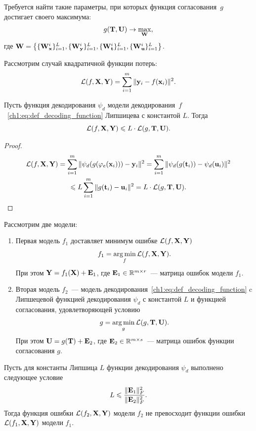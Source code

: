 Требуется найти такие параметры, при которых функция согласования~$g$ достигает своего максимума:
\begin{equation}
	g(\mathbf{T}, \mathbf{U}) \rightarrow \max_{\mathbf{W}},
	\label{concordance}
\end{equation}
где $\mathbf{W} = \bigl\{\{\mathbf{W}_{\mathbf{x}}^i\}_{i=1}^L, \{\mathbf{W}_{\mathbf{y}}^i\}_{i=1}^L, \{\mathbf{W}_{\mathbf{t}}^i\}_{i=1}^L, \{\mathbf{W}_{\mathbf{u}}^i\}_{i=1}^L\bigr\}$.

\hrulefill


Рассмотрим случай квадратичной функции потерь:
\[
\mathcal{L}(f, \mathbf{X}, \mathbf{Y}) = \sum_{i=1}^m \| \mathbf{y}_i - f(\mathbf{x}_i) \|^2.
\]

\begin{statement}
	\label{ch1:st:decod_lip}
	Пусть функция декодирования $\psi_d$ модели декодирования~$f$~\eqref{ch1:eq:def_decoding_function} Липшицева с константой $L$. Тогда 
	\[
		\mathcal{L}(f, \mathbf{X}, \mathbf{Y}) \leqslant L \cdot \mathcal{L}(g, \mathbf{T}, \mathbf{U}).
	\]
\end{statement}

\begin{proof}
	\begin{multline*}
		\mathcal{L}(f, \mathbf{X}, \mathbf{Y}) = \sum_{i=1}^m \| \psi_d (g (\varphi_e(\mathbf{x}_i))) - \mathbf{y}_i \|^2  = \sum_{i=1}^m \| \psi_d (g (\mathbf{t}_i)) - \psi_d (\mathbf{u}_i) \|^2 \\\leqslant L \sum_{i=1}^m \| g (\mathbf{t}_i) - \mathbf{u}_i \|^2 = L \cdot \mathcal{L}(g, \mathbf{T}, \mathbf{U}).
	\end{multline*}
\end{proof}
\begin{theorem}
	Рассмотрим две модели:
	\begin{enumerate}
		\item Первая модель $f_1$ доставляет минимум ошибке $\mathcal{L}(f, \mathbf{X}, \mathbf{Y})$
		\[
		f_1 = \mathop{\arg \min}\limits_f \mathcal{L}(f, \mathbf{X}, \mathbf{Y}).
		\]
		При этом $\mathbf{Y} = f_1(\mathbf{X}) + \mathbf{E}_1$, где $\mathbf{E}_1 \in \mathbb{R}^{m \times r}$~--- матрица ошибок модели $f_1$.
		
		\item Вторая модель $f_2$~--- модель декодирования~\eqref{ch1:eq:def_decoding_function} c Липшецевой функцией декодирования $\psi_d$ с константой $L$ и функцией согласования, удовлетворяющей условию
		\[
			g = \mathop{\arg \min}\limits_g \mathcal{L}(g, \mathbf{T}, \mathbf{U}).
		\]
		При этом $\mathbf{U} = g(\mathbf{T}) + \mathbf{E}_2$, где $\mathbf{E}_2 \in \mathbb{R}^{m \times s}$~--- матрица ошибок функции согласования $g$.
	\end{enumerate}
	Пусть для константы Липшица $L$ функции декодирования $\psi_d$ выполнено следующее условие
	\begin{equation}
		L \leqslant \frac{\|\mathbf{E}_1\|_F^2}{\|\mathbf{E}_2\|_F^2}.
		\label{ch1:eq:lip_ineq}
	\end{equation}
	Тогда функция ошибки $\mathcal{L}(f_2, \mathbf{X}, \mathbf{Y})$ модели $f_2$ не превосходит функции ошибки $\mathcal{L}(f_1, \mathbf{X}, \mathbf{Y})$ модели $f_1$.
\end{theorem}

